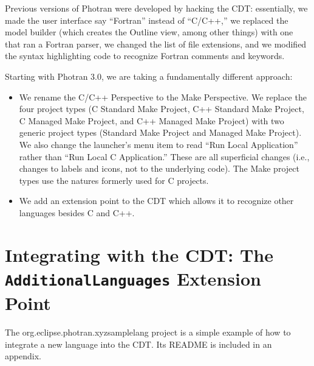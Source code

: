
Previous versions of Photran were developed by hacking the CDT: essentially,
we made the user interface say ``Fortran'' instead of ``C/C++,'' we replaced the
model builder (which creates the Outline view, among other things) with one
that ran a Fortran parser, we changed the list of file extensions, and we
modified the syntax highlighting code to recognize Fortran comments and
keywords.

Starting with Photran 3.0, we are taking a fundamentally different approach:
\begin{itemize}
\item We rename the C/C++ Perspective to the Make Perspective.  We replace
the four project types (C Standard Make Project, C++ Standard Make Project,
C Managed Make Project, and C++ Managed Make Project) with two generic
project types (Standard Make Project and Managed Make Project).  We also
change the launcher's menu item to read ``Run Local Application'' rather
than ``Run Local C Application.''  These are all superficial changes
(i.e., changes to labels and icons, not to the underlying code).  The
Make project types use the natures formerly used for C projects.
\item We add an extension point to the CDT which allows it to recognize
other languages besides C and C++.
\end{itemize}

\section{Integrating with the CDT: The \texttt{AdditionalLanguages}
            Extension Point}

The org.eclipse.photran.xyzsamplelang project is a simple example of how
to integrate a new language into the CDT.  Its README is included in an
appendix.

